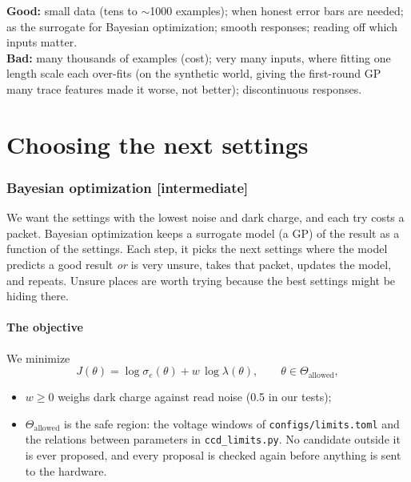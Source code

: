 \documentclass[11pt]{article}
\newcommand{\code}[1]{\texttt{#1}}
\newcommand{\level}[1]{\hfill{\normalfont\small\color{black!60}[#1]}}
\begin{document}
\begin{when}
\textbf{Good:} small data (tens to $\sim$1000 examples); when honest error bars are needed; as the surrogate for Bayesian
optimization; smooth responses; reading off which inputs matter.\\
\textbf{Bad:} many thousands of examples (cost); very many inputs, where fitting one length scale each over-fits (on the synthetic
world, giving the first-round GP many trace features made it worse, not better); discontinuous responses.
\end{when}

\part{Choosing the next settings}

\section{Bayesian optimization \level{intermediate}}
\label{sec:bo}

\begin{idea}
We want the settings with the lowest noise and dark charge, and each try costs a packet. Bayesian optimization keeps a surrogate
model (a GP) of the result as a function of the settings. Each step, it picks the next settings where the model predicts a good
result \emph{or} is very unsure, takes that packet, updates the model, and repeats. Unsure places are worth trying because the
best settings might be hiding there.
\end{idea}

\subsection{The objective}
We minimize
\begin{equation}
J(\theta) = \log\sigma_e(\theta) + w\,\log\lambda(\theta),\qquad \theta \in \Theta_\text{allowed},
\end{equation}
\begin{itemize}
\item $w \geq 0$ weighs dark charge against read noise (0.5 in our tests);
\item $\Theta_\text{allowed}$ is the safe region: the voltage windows of \code{configs/limits.toml} and the relations between
  parameters in \code{ccd\_limits.py}. No candidate outside it is ever proposed, and every proposal is checked again before
  anything is sent to the hardware.
\end{itemize}
\end{document}
